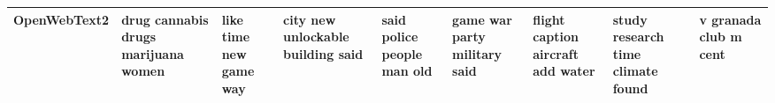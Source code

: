 \documentclass[11pt,a4paper]{article}
\begin{document}
\begin{appendices}
\begin{table}[htb]
\begin{tiny}
\begin{tabular}{|p{}|p{}|p{}|p{}|p{}|p{}|p{}|p{}|p{}|}
    OpenWebText2 & drug \newline cannabis \newline drugs \newline marijuana \newline women & like \newline time \newline new \newline game \newline way & city \newline new \newline unlockable \newline building \newline said & said \newline police \newline people \newline man \newline old & game \newline war \newline party \newline military \newline said & flight \newline caption \newline aircraft \newline add \newline water & study \newline research \newline time \newline climate \newline found & v \newline granada \newline club \newline m \newline cent\\\hline

\end{tabular}
\end{tiny}
\end{table}
\end{appendices}
\end{document}
